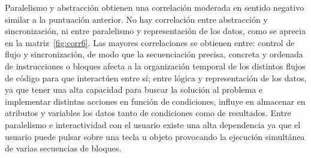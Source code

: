 \documentclass[a4paper, 12pt]{book}
\begin{document}
Paralelismo y abstracción obtienen una correlación moderada en sentido negativo similar a la puntuación anterior. No hay correlación entre abstracción y sincronización, ni entre paralelismo y representación de los datos, como se aprecia en la matriz~\ref{fig:corr6}. Las mayores correlaciones se obtienen entre: control de flujo y sincronización, de modo que la secuenciación precisa, concreta y ordenada de instrucciones o bloques afecta a la organización temporal de los distintos flujos de código para que interactúen entre sí; entre lógica y representación de los datos, ya que tener una alta capacidad para buscar la solución al problema e implementar distintas acciones en función de condiciones, influye en almacenar en atributos y variables los datos tanto de condiciones como de resultados. Entre paralelismo e interactividad con el usuario existe una alta  dependencia ya que el usuario puede pulsar sobre una tecla u objeto provocando la ejecución simultánea de varias secuencias de bloques.%
\end{document}
